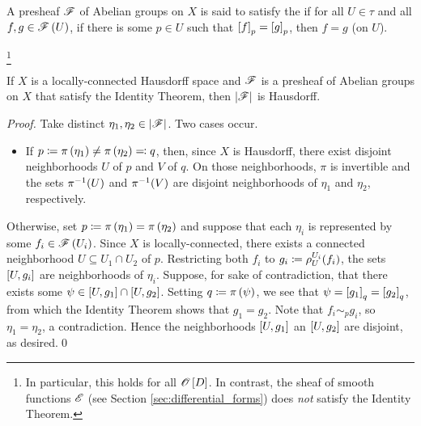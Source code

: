 \documentclass[../Moduli_Spaces_of_Riemann_Surfaces.tex]{subfiles}
\begin{document}
    \begin{definition}
        A presheaf $\mathscr{F}$ of Abelian groups on $X$ is said to satisfy the  if for all $U\in\tau$ and all $f,g\in\mathscr{F}\left(U\right)$, if there is some $p\in U$ such that $\left[f\right]_p=\left[g\right]_p$, then $f=g$ (on $U$).
    \end{definition}
    \footnote{In particular, this holds for all $\mathscr{O}\left[D\right]$. In contrast, the sheaf of smooth functions $\mathscr{E}$ (see Section \ref{sec:differential_forms}) does \textit{not} satisfy the Identity Theorem.}
    \begin{proposition}\label{2.2:prp:stalk_topology_Hausdorff}
        If $X$ is a locally-connected Hausdorff space and $\mathscr{F}$ is a presheaf of Abelian groups on $X$ that satisfy the Identity Theorem, then $\left|\mathscr{F}\right|$ is Hausdorff.
    \end{proposition}
    \begin{proof}
        Take distinct $\eta_1,\eta_2\in\left|\mathscr{F}\right|$. Two cases occur.
        \begin{itemize}
            \item If $p\coloneqq\pi\left(\eta_1\right)\neq\pi\left(\eta_2\right)\eqqcolon q$, then, since $X$ is Hausdorff, there exist disjoint neighborhoods $U$ of $p$ and $V$ of $q$. On those neighborhoods, $\pi$ is invertible and the sets $\pi^{-1}\!\left(U\right)$ and $\pi^{-1}\!\left(V\right)$ are disjoint neighborhoods of $\eta_1$ and $\eta_2$, respectively.
        \end{itemize}
        Otherwise, set $p\coloneqq\pi\left(\eta_1\right)=\pi\left(\eta_2\right)$ and suppose that each $\eta_i$ is represented by some $f_i\in\mathscr{F}\left(U_i\right)$. Since $X$ is locally-connected, there exists a connected neighborhood $U\subseteq U_1\cap U_2$ of $p$. Restricting both $f_i$ to $g_i\coloneqq\rho^{U_i}_U\!\left(f_i\right)$, the sets $\left[U,g_i\right]$ are neighborhoods of $\eta_i$. Suppose, for sake of contradiction, that there exists some $\psi\in\left[U,g_1\right]\cap\left[U,g_2\right]$. Setting $q\coloneqq\pi\left(\psi\right)$, we see that $\psi=\left[g_1\right]_q=\left[g_2\right]_q$, from which the Identity Theorem shows that $g_1=g_2$. Note that $f_i\sim_pg_i$, so $\eta_1=\eta_2$, a contradiction. Hence the neighborhoods $\left[U,g_1\right]$ an $\left[U,g_2\right]$ are disjoint, as desired.\qed
    \end{proof}
\end{document}
